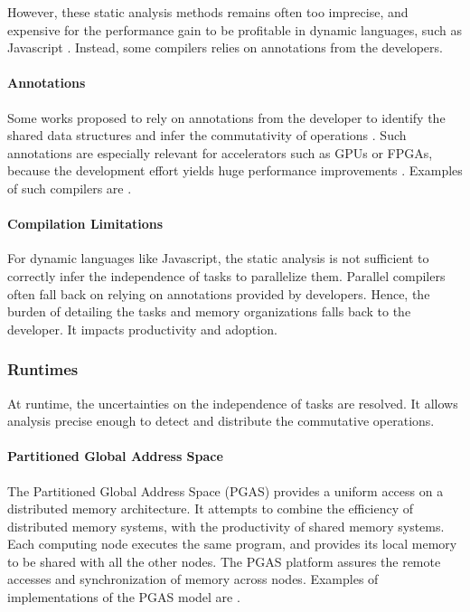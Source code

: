 However, these static analysis methods remains often too imprecise, and expensive for the performance gain to be profitable in dynamic languages, such as Javascript \cite{Shivers1991}.
Instead, some compilers relies on annotations from the developers.

\paragraph{Annotations}

Some works proposed to rely on annotations from the developer to identify the shared data structures and infer the commutativity of operations \cite{Vandierendonck2010a,Fernandez2014a}.
Such annotations are especially relevant for accelerators such as GPUs or FPGAs, because the development effort yields huge performance improvements \cite{Tarditi2006}.
Examples of such compilers are .


\paragraph{Compilation Limitations}

For dynamic languages like Javascript, the static analysis is not sufficient to correctly infer the independence of tasks to parallelize them.
Parallel compilers often fall back on relying on annotations provided by developers.
Hence, the burden of detailing the tasks and memory organizations falls back to the developer.
It impacts productivity and adoption.

\subsubsection{Runtimes} \label{chapter3:software-adoption:runtimes}

At runtime, the uncertainties on the independence of tasks are resolved.
It allows analysis precise enough to detect and distribute the commutative operations.

\paragraph{Partitioned Global Address Space}

The Partitioned Global Address Space (PGAS) provides a uniform access on a distributed memory architecture.
It attempts to combine the efficiency of distributed memory systems, with the productivity of shared memory systems.
Each computing node executes the same program, and provides its local memory to be shared with all the other nodes.
The PGAS platform assures the remote accesses and synchronization of memory across nodes.
Examples of implementations of the PGAS model are .

